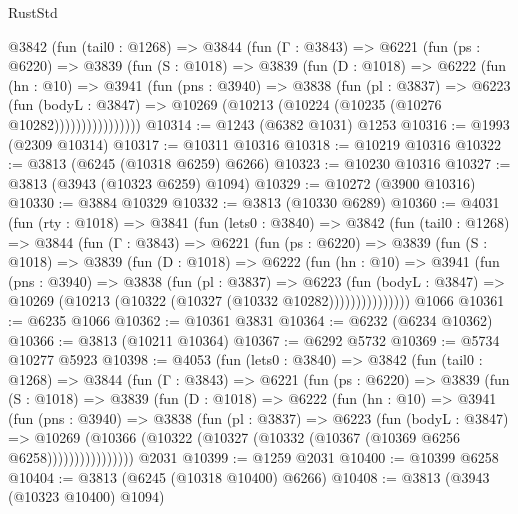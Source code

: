\begin{lexlean}{RustStd}
\begin{coremodule}
{\begin{coremodule}
{{{{{{{{{{{{{{{{{{{{{{{{{{{{{{{{{{{        @3842
          (fun (tail0 : @1268) =>
          @3844
            (fun (Γ : @3843) =>
            @6221
              (fun (ps : @6220) =>
              @3839
                (fun (S : @1018) =>
                @3839
                  (fun (D : @1018) =>
                  @6222
                    (fun (hn : @10) =>
                    @3941
                      (fun (pns : @3940) =>
                      @3838
                        (fun (pl : @3837) =>
                        @6223
                          (fun (bodyL : @3847) =>
                          @10269 (@10213 (@10224 (@10235 (@10276 @10282))))))))))))))))
@10314 := @1243 (@6382 @1031) @1253
@10316 := @1993 (@2309 @10314)
@10317 := @10311 @10316
@10318 := @10219 @10316
@10322 := @3813 (@6245 (@10318 @6259) @6266)
@10323 := @10230 @10316
@10327 := @3813 (@3943 (@10323 @6259) @1094)
@10329 := @10272 (@3900 @10316)
@10330 := @3884 @10329
@10332 := @3813 (@10330 @6289)
@10360 := @4031
    (fun (rty : @1018) =>
    @3841
      (fun (lets0 : @3840) =>
      @3842
        (fun (tail0 : @1268) =>
        @3844
          (fun (Γ : @3843) =>
          @6221
            (fun (ps : @6220) =>
            @3839
              (fun (S : @1018) =>
              @3839
                (fun (D : @1018) =>
                @6222
                  (fun (hn : @10) =>
                  @3941
                    (fun (pns : @3940) =>
                    @3838
                      (fun (pl : @3837) =>
                      @6223
                        (fun (bodyL : @3847) =>
                        @10269 (@10213 (@10322 (@10327 (@10332 @10282)))))))))))))))
    @1066
@10361 := @6235 @1066
@10362 := @10361 @3831
@10364 := @6232 (@6234 @10362)
@10366 := @3813 (@10211 @10364)
@10367 := @6292 @5732
@10369 := @5734 @10277 @5923
@10398 := @4053
    (fun (lets0 : @3840) =>
    @3842
      (fun (tail0 : @1268) =>
      @3844
        (fun (Γ : @3843) =>
        @6221
          (fun (ps : @6220) =>
          @3839
            (fun (S : @1018) =>
            @3839
              (fun (D : @1018) =>
              @6222
                (fun (hn : @10) =>
                @3941
                  (fun (pns : @3940) =>
                  @3838
                    (fun (pl : @3837) =>
                    @6223
                      (fun (bodyL : @3847) =>
                      @10269
                        (@10366 (@10322 (@10327 (@10332 (@10367 (@10369 @6256 @6258))))))))))))))))
    @2031
@10399 := @1259 @2031
@10400 := @10399 @6258
@10404 := @3813 (@6245 (@10318 @10400) @6266)
@10408 := @3813 (@3943 (@10323 @10400) @1094)
}}}}}}}}}}}}}}}}}}}}}}}}}}}}}}}}}}}
\end{coremodule}}
\end{coremodule}
\end{lexlean}
